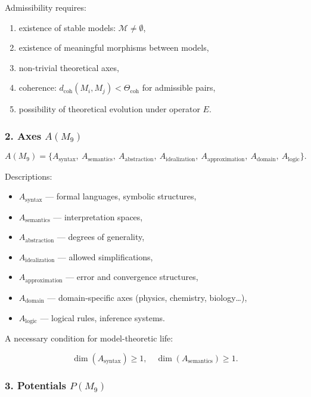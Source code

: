 Admissibility requires:

\begin{enumerate}
    \item existence of stable models: $\mathcal{M}\neq\emptyset$,
    \item existence of meaningful morphisms between models,
    \item non-trivial theoretical axes,
    \item coherence: $d_{\mathrm{coh}}(M_i, M_j)<\Theta_{\mathrm{coh}}$ for admissible pairs,
    \item possibility of theoretical evolution under operator $E$.
\end{enumerate}

\subsubsection*{2. Axes \texorpdfstring{$A(M_9)$}{A(M_9)}}

\[
A(M_9)=
\{
A_{\mathrm{syntax}},\
A_{\mathrm{semantics}},\
A_{\mathrm{abstraction}},\
A_{\mathrm{idealization}},\
A_{\mathrm{approximation}},\
A_{\mathrm{domain}},\
A_{\mathrm{logic}}
\}.
\]

Descriptions:

\begin{itemize}
    \item $A_{\mathrm{syntax}}$ — formal languages, symbolic structures,
    \item $A_{\mathrm{semantics}}$ — interpretation spaces,
    \item $A_{\mathrm{abstraction}}$ — degrees of generality,
    \item $A_{\mathrm{idealization}}$ — allowed simplifications,
    \item $A_{\mathrm{approximation}}$ — error and convergence structures,
    \item $A_{\mathrm{domain}}$ — domain-specific axes (physics, chemistry, biology…),
    \item $A_{\mathrm{logic}}$ — logical rules, inference systems.
\end{itemize}

A necessary condition for model-theoretic life:

\[
\dim(A_{\mathrm{syntax}})\ge 1,
\quad
\dim(A_{\mathrm{semantics}})\ge 1.
\]

\subsubsection*{3. Potentials \texorpdfstring{$P(M_9)$}{P(M_9)}}

